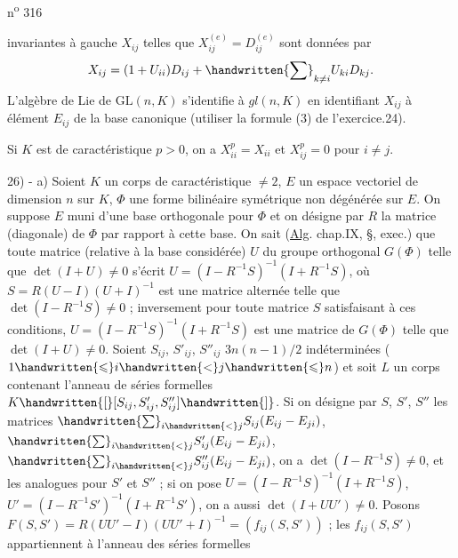 \hfill n\textsuperscript{o} 316

invariantes à gauche $X_{ij}$ telles que $X_{ij}^{(e)}=D_{ij}^{(e)}$ sont données par
\[
X_{ij}=(1+U_{ii})D_{ij}+\handwritten{\sum}_{k\ne i}U_{ki}D_{kj}.
\]
L'algèbre de Lie de $\mathrm{GL}(n,K)$ s'identifie à $\mathit{gl}(n,K)$ en identifiant $X_{ij}$ à élément $E_{ij}$ de la base canonique (utiliser la formule (3) de l'exercice.24).

Si $K$ est de caractéristique $p>0$, on a $X_{ii}^p=X_{ii}$ et $X_{ij}^p=0$ pour $i\ne j$.

\margin{\handwritten{$\unsure{\Pi|\pi}$}}
26) - a) Soient $K$ un corps de caractéristique $\ne2$, $E$ un espace vectoriel de dimension $n$ sur $K$, $\Phi$ une forme bilinéaire symétrique non dégénérée sur $E$. On suppose $E$ muni d'une base orthogonale pour $\Phi$ et on désigne par $R$ la matrice (diagonale) de $\Phi$ par rapport à cette base. On sait (\uline{Alg}. chap.IX, \S\quad, exec.\quad) que toute matrice (relative à la base considérée) $U$ du groupe orthogonal $G(\Phi)$ telle que $\det(I+U)\ne0$ s'écrit $U=(I-R^{-1}S)^{-1}(I+R^{-1}S)$, où $S=R(U-I)(U+I)^{-1}$ est une matrice alternée telle que $\det(I-R^{-1}S)\ne0$ ; inversement pour toute matrice $S$ satisfaisant à ces conditions, $U=(I-R^{-1}S)^{-1}(I+R^{-1}S)$ est une matrice de $G(\Phi)$ telle que $\det(I+U)\ne0$. Soient $S_{ij}$, $S'_{ij}$, $S''_{ij}$ $3n(n-1)/2$ indéterminées ($1\handwritten{\leqslant}i\handwritten{<}j\handwritten{\leqslant}n$) et soit $L$ un corps contenant l'anneau de séries formelles $K\handwritten{[}[S_{ij},S'_{ij},S''_{ij}]\handwritten{]}$. Si on désigne par $S$, $S'$, $S''$ les matrices $\handwritten{\sum}_{i\handwritten{<}j}S_{ij}(E_{ij}-E_{ji})$, $\handwritten{\sum}_{i\handwritten{<}j}S'_{ij}(E_{ij}-E_{ji})$, $\handwritten{\sum}_{i\handwritten{<}j}S''_{ij}(E_{ij}-E_{ji})$, on a $\det(I-R^{-1}S)\ne0$, et les analogues pour $S'$ et $S''$ ; si on pose $U=(I-R^{-1}S)^{-1}(I+R^{-1}S)$, $U'=(I-R^{-1}S')^{-1}(I+R^{-1}S')$, on a aussi $\det(I+UU')\ne0$. Posons $F(S,S')=R(UU'-I)(UU'+I)^{-1}=(f_{ij}(S,S'))$ ; les $f_{ij}(S,S')$ appartiennent à l'anneau des séries formelles
